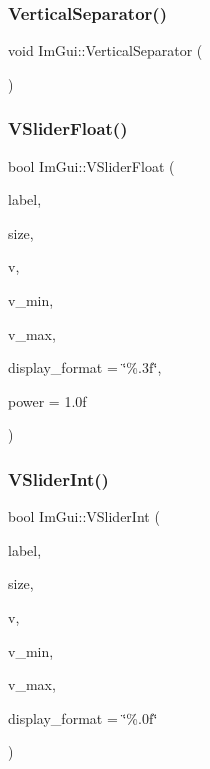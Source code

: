 \hypertarget{namespace_im_gui_ae60f7b8ece8808c477796e6594c8d796}{}\label{namespace_im_gui_ae60f7b8ece8808c477796e6594c8d796} 
\subsubsection{\texorpdfstring{Vertical\+Separator()}{VerticalSeparator()}}
{\footnotesize\ttfamily void Im\+Gui\+::\+Vertical\+Separator (\begin{DoxyParamCaption}{ }\end{DoxyParamCaption})}

\hypertarget{namespace_im_gui_ae629791ee70ba60199597cd1866b3735}{}\label{namespace_im_gui_ae629791ee70ba60199597cd1866b3735} 
\subsubsection{\texorpdfstring{V\+Slider\+Float()}{VSliderFloat()}}
{\footnotesize\ttfamily bool Im\+Gui\+::\+V\+Slider\+Float (\begin{DoxyParamCaption}\item[{const char $\ast$}]{label,  }\item[{const \hyperlink{struct_im_vec2}{Im\+Vec2} \&}]{size,  }\item[{float $\ast$}]{v,  }\item[{float}]{v\+\_\+min,  }\item[{float}]{v\+\_\+max,  }\item[{const char $\ast$}]{display\+\_\+format = {\ttfamily \char`\"{}\%.3f\char`\"{}},  }\item[{float}]{power = {\ttfamily 1.0f} }\end{DoxyParamCaption})}

\hypertarget{namespace_im_gui_a7a8e53471ef7f8b7ad28abea35a40bf4}{}\label{namespace_im_gui_a7a8e53471ef7f8b7ad28abea35a40bf4} 
\subsubsection{\texorpdfstring{V\+Slider\+Int()}{VSliderInt()}}
{\footnotesize\ttfamily bool Im\+Gui\+::\+V\+Slider\+Int (\begin{DoxyParamCaption}\item[{const char $\ast$}]{label,  }\item[{const \hyperlink{struct_im_vec2}{Im\+Vec2} \&}]{size,  }\item[{int $\ast$}]{v,  }\item[{int}]{v\+\_\+min,  }\item[{int}]{v\+\_\+max,  }\item[{const char $\ast$}]{display\+\_\+format = {\ttfamily \char`\"{}\%.0f\char`\"{}} }\end{DoxyParamCaption})}

